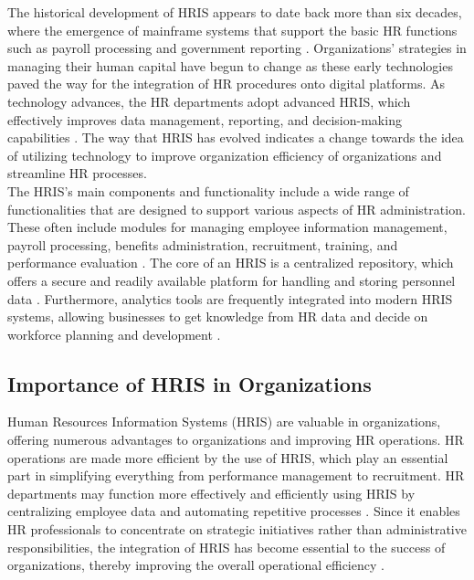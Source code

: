         The historical development of HRIS appears to date back more than six decades, where the emergence of mainframe systems that support the basic HR functions such as payroll processing and government reporting \cite{srr12023}. Organizations’ strategies in managing their human capital have begun to change as these early technologies paved the way for the integration of HR procedures onto digital platforms. As technology advances, the HR departments adopt advanced HRIS, which effectively improves data management, reporting,  and decision-making capabilities  \cite{ml12019}. The way that HRIS has evolved indicates a change towards the idea of utilizing technology to improve organization efficiency of organizations and streamline HR processes.
        \\
        
        The HRIS’s main components and functionality include a wide range of functionalities that are designed to support various aspects of HR administration. These often include modules for managing employee information management, payroll processing, benefits administration, recruitment, training, and performance evaluation \cite{ep12023}. The core of an HRIS is a centralized repository, which offers a secure and readily available platform for handling and storing personnel data \cite{h12020}. Furthermore, analytics tools are frequently integrated into modern HRIS systems, allowing businesses to get knowledge from HR data and decide on workforce planning and development \cite{aa12021}.
        
    \subsection{Importance of HRIS in Organizations}
    
        Human Resources Information Systems (HRIS) are valuable in organizations, offering numerous advantages to organizations and improving HR operations. HR operations are made more efficient by the use of HRIS, which play an essential part in simplifying everything from performance management to recruitment. HR departments may function more effectively and efficiently using HRIS by centralizing employee data and automating repetitive processes \cite{s12024}. Since it enables HR professionals to concentrate on strategic initiatives rather than administrative responsibilities, the integration of HRIS has become essential to the success of organizations, thereby improving the overall operational efficiency \cite{ta12023}. 
        \\


